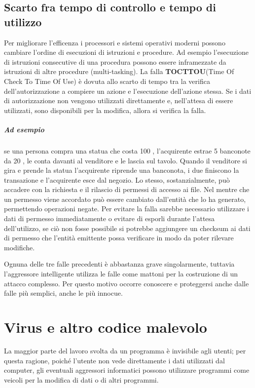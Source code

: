 \subsection{Scarto fra tempo di controllo e tempo di utilizzo}
Per migliorare l'efficenza i processori e sistemi operativi moderni possono cambiare l'ordine di esecuzioni di istruzioni e procedure. Ad esempio l'esecuzione di istruzioni consecutive di una procedura possono essere inframezzate da istruzioni di altre procedure (multi-tasking).
\newline
La falla \textbf{TOCTTOU}(Time Of Check To Time Of Use) è dovuta allo scarto di tempo tra la verifica dell'autorizzazione a compiere un azione e l'esecuzione dell'azione stessa. Se i dati di autorizzazione non vengono utilizzati direttamente e, nell'attesa di essere utilizzati, sono disponibili per la modifica, allora si verifica la falla.
\subparagraph{Ad esempio} se una persona compra una statua che costa 100 \officialeuro, l'acquirente estrae 5 banconote da 20 \officialeuro, le conta davanti al venditore e le lascia sul tavolo. Quando il venditore si gira e prende la statua l'acquirente riprende una banconota, i due finiscono la transazione e l'acquirente esce dal negozio.
Lo stesso, sostanzialmente, può accadere con la richiesta e il rilascio di permessi di accesso ai file. Nel mentre che un permesso viene accordato può essere cambiato dall'entità che lo ha generato, permettendo operazioni negate.
\newline
Per evitare la falla sarebbe necessario utilizzare i dati di permesso immediatamente o evitare di esporli durante l'attesa dell'utilizzo, se ciò non fosse possibile si potrebbe aggiungere un checksum ai dati di permesso che l'entità emittente possa verificare in modo da poter rilevare modifiche.

Ognuna delle tre falle precedenti è abbastanza grave singolarmente, tuttavia l'aggressore intelligente utilizza le falle come mattoni per la costruzione di un attacco complesso.
Per questo motivo occorre conoscere e proteggersi anche dalle falle più semplici, anche le più innocue.

\section{Virus e altro codice malevolo}
La maggior parte del lavoro svolta da un programma è invisibile agli utenti; per questa ragione, poiché l'utente non vede direttamente i dati utilizzati dal computer, gli eventuali aggressori informatici possono utilizzare programmi come veicoli per la modifica di dati o di altri programmi.
